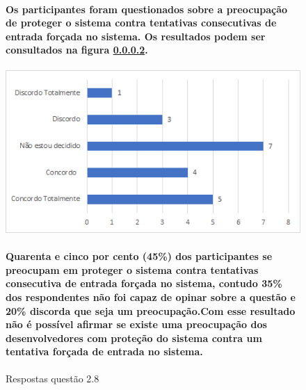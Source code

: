 \begin{figure}[!t]
\centering

\paragraph{Os participantes foram questionados sobre a preocupação de proteger o sistema contra tentativas consecutivas de entrada forçada no sistema. Os resultados podem ser consultados na figura \ref{fig:2.8}.
}

\includegraphics[scale=0.7]{figuras das questoes/2.8.png}
\caption{Respostas questão 2.8}

\paragraph{
Quarenta e cinco por cento (45{\%}) dos participantes se preocupam em proteger o sistema contra tentativas consecutiva de entrada forçada no sistema, contudo 35{\%} dos respondentes não foi capaz de opinar sobre a questão e 20{\%} discorda que seja um preocupação.Com esse resultado não é possível afirmar se existe uma preocupação dos desenvolvedores com proteção do sistema contra um tentativa forçada de entrada no sistema.
}

\label{fig:2.8}
\end{figure}
